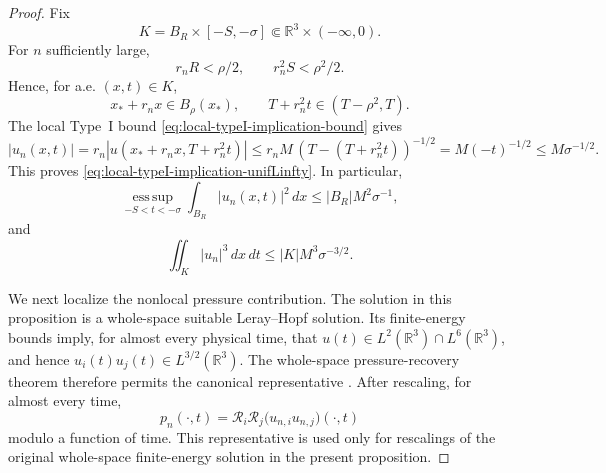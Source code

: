 \documentclass[11pt]{amsart}
\numberwithin{equation}{section}
\theoremstyle{plain}
\theoremstyle{definition}
\theoremstyle{remark}
\newcommand{\R}{\mathbb R}
\newcommand{\esssup}{\operatorname*{ess\,sup}}
\begin{document}
\begin{proof}
Fix
\[
   K=B_R\times[-S,-\sigma]\Subset\R^3\times(-\infty,0).
\]
For \(n\) sufficiently large,
\[
   r_nR<\rho/2,\qquad r_n^2S<\rho^2/2.
\]
Hence, for a.e. \((x,t)\in K\),
\[
   x_*+r_nx\in B_\rho(x_*),
   \qquad
   T+r_n^2t\in(T-\rho^2,T).
\]
The local Type~I bound \eqref{eq:local-typeI-implication-bound} gives
\[
   |u_n(x,t)|
   =r_n|u(x_*+r_nx,T+r_n^2t)|
   \le r_n M\,(T-(T+r_n^2t))^{-1/2}
   =M(-t)^{-1/2}
   \le M\sigma^{-1/2}.
\]
This proves \eqref{eq:local-typeI-implication-unifLinfty}.  In particular,
\[
   \esssup_{-S<t<-\sigma}\int_{B_R}|u_n(x,t)|^2\,dx
   \le |B_R|M^2\sigma^{-1},
\]
and
\[
   \iint_K |u_n|^3\,dx\,dt
   \le |K|M^3\sigma^{-3/2}.
\]

We next localize the nonlocal pressure contribution.  The solution in this
proposition is a whole-space suitable Leray--Hopf solution.  Its finite-energy
bounds imply, for almost every physical time, that
\(u(t)\in L^2(\R^3)\cap L^6(\R^3)\), and hence
\(u_i(t)u_j(t)\in L^{3/2}(\R^3)\).  The whole-space pressure-recovery theorem
therefore permits the canonical representative
\cite{AlvarezSamaniegoEtAl2021}.  After rescaling, for almost every time,
\[
   p_n(\cdot,t)=\mathcal R_i\mathcal R_j
      \bigl(u_{n,i}u_{n,j}\bigr)(\cdot,t)
\]
modulo a function of time.  This representative is used only for rescalings
of the original whole-space finite-energy solution in the present proposition.


\end{proof}
\end{document}

